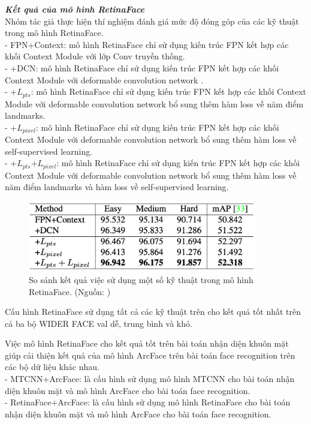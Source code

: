 {    \noindent
    \textbf{\textit{Kết quả của mô hình RetinaFace}} \\
    Nhóm tác giả thực hiện thí nghiệm đánh giá mức độ đóng góp của các kỹ thuật trong mô hình RetinaFace. \\
    - FPN+Context: mô hình RetinaFace chỉ sử dụng kiến trúc FPN kết hợp các khối Context Module \cite{najibi2017ssh} với lớp Conv truyền thống. \\
    - +DCN: mô hình RetinaFace chỉ sử dụng kiến trúc FPN kết hợp các khối Context Module \cite{najibi2017ssh} với deformable convolution network \cite{dai2017deformable}. \\
    - +$L_{pts}$: mô hình RetinaFace chỉ sử dụng kiến trúc FPN kết hợp các khối Context Module \cite{najibi2017ssh} với deformable convolution network \cite{dai2017deformable} bổ sung thêm hàm loss về năm điểm landmarks. \\
    - +$L_{pixel}$: mô hình RetinaFace chỉ sử dụng kiến trúc FPN kết hợp các khối Context Module \cite{najibi2017ssh} với deformable convolution network \cite{dai2017deformable} bổ sung thêm hàm loss về self-supervised learning. \\
    - +$L_{pts}$+$L_{pixel}$: mô hình RetinaFace chỉ sử dụng kiến trúc FPN kết hợp các khối Context Module \cite{najibi2017ssh} với deformable convolution network \cite{dai2017deformable} bổ sung thêm hàm loss về năm điểm landmarks và hàm loss về self-supervised learning. \\

    \begin{figure}[H]
        \centering
        \includegraphics[width=10cm] {images/retinaface_results_1}
        \caption{So sánh kết quả việc sử dụng một số kỹ thuật trong mô hình RetinaFace. (Nguồn: \cite{deng2020retinaface})}
        \label{fig:retinaface_results_1}
    \end{figure}

    \noindent
    Cấu hình RetinaFace sử dụng tất cả các kỹ thuật trên cho kết quả tốt nhất trên cả ba bộ WIDER FACE val dễ, trung bình và khó.

    \noindent
    Việc mô hình RetinaFace cho kết quả tốt trên bài toán nhận diện khuôn mặt giúp cải thiện kết quả của mô hình ArcFace trên bài toán face recognition trên các bộ dữ liệu khác nhau. \\
    - MTCNN+ArcFace: là cấu hình sử dụng mô hình MTCNN \cite{zhang2016joint} cho bài toán nhận diện khuôn mặt và mô hình ArcFace \cite{deng2019arcface} cho bài toán face recognition. \\
    - RetinaFace+ArcFace: là cấu hình sử dụng mô hình RetinaFace cho bài toán nhận diện khuôn mặt và mô hình ArcFace \cite{deng2019arcface} cho bài toán face recognition.

}

